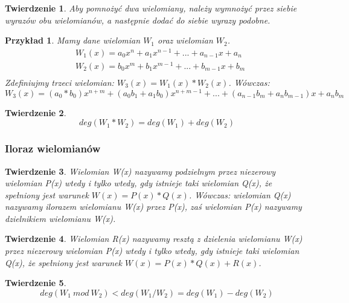 \documentclass[twoside,a4paper]{book}
\newtheorem{theorem}{Twierdzenie}
\newtheorem{example}{Przykład}
\begin{document}
\begin{theorem}
	Aby pomnożyć dwa wielomiany, należy wymnożyć przez siebie wyrazów obu wielomianów, a następnie dodać do siebie wyrazy podobne.
\end{theorem}

\begin{example}
	Mamy dane wielomian $W_1$ oraz wielomian $W_2$.
	\begin{equation}
	\begin{split}
	&W_1(x) = a_0x^n + a_1x^{n-1} + ... + a_{n-1}x + a_n \\
	&W_2(x) = b_0x^m + b_1x^{m-1} + ... + b_{m-1}x + b_m \\
	\end{split}
	\end{equation}
	Zdefiniujmy trzeci wielomian: $W_3(x) = W_1(x) * W_2(x)$. Wówczas:
	\begin{equation}
	W_3(x) = (a_0*b_0)x^{n+m} + (a_0b_1+a_1b_0)x^{n+m-1} + ... + (a_{n-1}b_m + a_nb_{m-1})x + a_nb_m
	\end{equation}
\end{example}

\begin{theorem}
	\begin{equation}
	deg(W_1 * W_2) = deg(W_1) + deg(W_2)
	\end{equation}
\end{theorem}

\subsubsection{Iloraz wielomianów}

\begin{theorem}
	Wielomian W(x) nazywamy podzielnym przez niezerowy wielomian P(x) wtedy i tylko wtedy, gdy istnieje taki wielomian Q(x), że spełniony jest warunek $W(x) = P(x) * Q(x)$. Wówczas: wielomian Q(x) nazywamy ilorazem wielomianu W(x) przez P(x), zaś wielomian P(x) nazywamy dzielnikiem wielomianu W(x).
\end{theorem}

\begin{theorem}
	Wielomian R(x) nazywamy resztą z dzielenia wielomianu W(x) przez niezerowy wielomian P(x) wtedy i tylko wtedy, gdy istnieje taki wielomian Q(x), że spełniony jest warunek $W(x) = P(x) * Q(x) + R(x)$.
\end{theorem}


\begin{theorem}
	\begin{equation}
	deg(W_1\ mod\ W_2) < deg(W_1 / W_2) = deg(W_1) - deg(W_2)
	\end{equation}
\end{theorem}
\end{document}
